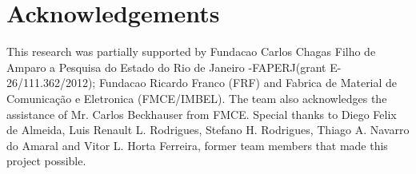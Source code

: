 \section*{Acknowledgements}
This research was partially supported by Fundacao Carlos Chagas Filho de Amparo a Pesquisa do Estado do Rio de Janeiro -FAPERJ(grant E-26/111.362/2012);
Fundacao Ricardo Franco (FRF) and Fabrica de Material de Comunicação e Eletronica (FMCE/IMBEL). The team also acknowledges the assistance of Mr. Carlos
Beckhauser from FMCE. Special thanks to Diego Felix de Almeida, Luis Renault L. Rodrigues, Stefano H. Rodrigues, Thiago A. Navarro do Amaral and Vitor L. Horta Ferreira,
former team members that made this project possible.
